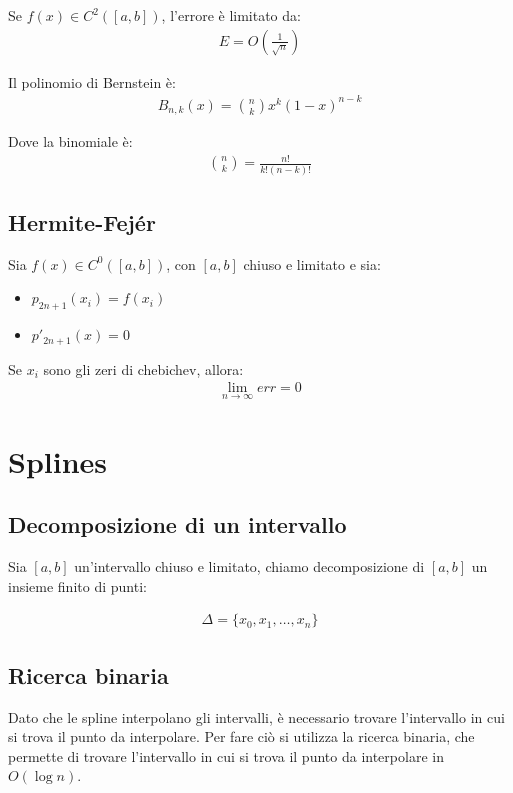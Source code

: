 Se $f(x) \in C^2([a, b])$, l'errore è limitato da:
\begin{align}
  E = O(\frac{1}{\sqrt{n}})
\end{align}

Il polinomio di Bernstein è:
\begin{align}
  B_{n, k}(x) = \binom{n}{k} x^k (1-x)^{n-k}
\end{align}

Dove la binomiale è:
\begin{align}
  \binom{n}{k} = \frac{n!}{k!(n-k)!}
\end{align}





\subsection{Hermite-Fejér}
Sia $f(x) \in C^0([a, b])$, con $[a, b]$ chiuso e limitato e sia:
\begin{itemize}
  \item $p_{2n+1}(x_i) = f(x_i)$
  \item $p'_{2n+1}(x) = 0$
\end{itemize}

Se $x_i$ sono gli zeri di chebichev, allora:
\begin{align}
  \lim_{n \rightarrow \infty} err = 0
\end{align}




\section{Splines}


\subsection{Decomposizione di un intervallo}
Sia $[a, b]$ un'intervallo chiuso e limitato, chiamo decomposizione di $[a, b]$ un insieme finito di punti:

\begin{align}
  \Delta = \{x_0, x_1, \dots, x_n\}
\end{align}



\subsection{Ricerca binaria}
Dato che le spline interpolano gli intervalli, è necessario trovare l'intervallo in cui si trova il punto da interpolare. Per fare ciò si utilizza la ricerca binaria, che permette di trovare l'intervallo in cui si trova il punto da interpolare in $O(\log n)$.

